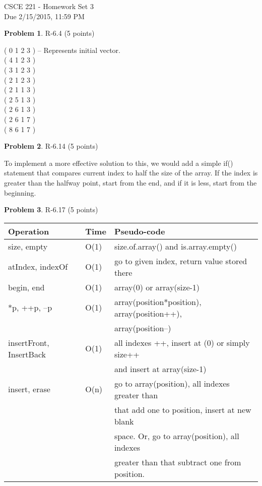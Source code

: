 \documentclass[12pt]{report}
\theoremstyle{definition}
\newtheorem{problem}{Problem}
\begin{document}
\vspace*{-15mm}
\begin{center}
{\large
					CSCE 221 - Homework Set 3 \\
					Due 2/15/2015, 11:59 PM}
\end{center}

\begin{problem} 		R-6.4 (5 points)
\end{problem}			
					( 0  1  2  3 ) -- Represents initial vector. \\
					( 4  1  2  3 ) \\
					( 3  1  2  3 ) \\
					( 2  1  2  3 ) \\
					( 2  1  1  3 ) \\
					( 2  5  1  3 ) \\
					( 2  6  1  3 ) \\
					( 2  6  1  7 ) \\
					( 8  6  1  7 )

\begin{problem}			R-6.14 (5 points)
\end{problem}
					To implement a more effective solution to this, we would add a simple if() statement that 					compares current index to half the size of the array. If the index is greater than the 						halfway point, start from the end, and if it is less, start from the beginning. \\
					
\begin{problem}			R-6.17 (5 points)
\end{problem}
				\begin{tabular}{| l | l | l |}
					\hline
					Operation & Time & Pseudo-code \\ 
					\hline
					size, empty 			& O(1) 	& size.of.array() and is.array.empty()	\\
					atIndex, indexOf 		& O(1)	& go to given index, return value stored there \\
					begin, end				& O(1)	& array(0) or array(size-1)	 \\
					*p, ++p, --p			& O(1)	& array(position*position), array(position++), \\											&		& array(position--)  \\
					insertFront, InsertBack	& O(1)	& all indexes ++, insert at (0) or simply size++ \\										&		&	and insert at array(size-1) \\
					insert, erase			& O(n)	& go to array(position), all indexes greater than \\										&		&	that add one to position, insert at new blank \\										&		&	space. Or, go to array(position), all indexes \\										&		&	greater than that subtract one from position.\\
					\hline
				\end{tabular}
					
\end{document}
